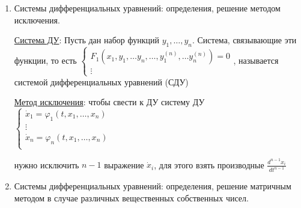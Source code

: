 \documentclass[12pt]{article}
\begin{document}
\begin{enumerate}
\begin{enumerate}
            \item Поиск частного решения в виде $y^*(x) = C_1(x)y_1(x) + C_2(x)y_2(x)$, где функции $C_1(x), C_2(x)$ заменяют константы из общего решения однородного уравнения

            \item Решение системы для производных $C_1^\prime(x), C_2^\prime(x)$:
            
            $\begin{cases} 
            C_1^\prime y_1 + C_2^\prime y_2 = 0 \\
            C_1^\prime y_1^\prime + C_2^\prime y_2^\prime = f(x)
            \end{cases}$
            
            с использованием вронскиана $W = y_1y_2^\prime - y_2y_1^\prime$
            \item Интегрирование выражений: 
            
            $C_1(x) = \int -\frac{y_2 f}{W}dx, \quad C_2(x) = \int \frac{y_1 f}{W}dx$
        \end{enumerate}


        \item Системы дифференциальных уравнений: определения, решение методом исключения.

        \hyperlink{desystem}{Система ДУ}: \Defs Пусть дан набор функций $y_1, \dots, y_n$. Система, связывающие эти функции, то есть
        $\begin{cases}
             F_1(x_1, y_1, \dots y_n, \dots, y_1^{(n)}, \dots y_n^{(n)}) = 0 \\
             \vdots
        \end{cases}$, называется системой дифференциальных уравнений (СДУ)

        \hyperlink{exceptionmethod}{Метод исключения}: чтобы свести к ДУ систему ДУ $\begin{cases}
            \dot x_1 = \varphi_1(t, x_1, \dots, x_n) \\
            \vdots \\
            \dot x_n = \varphi_n(t, x_1, \dots, x_n) \\
       \end{cases}$ 
       
       нужно исключить $n - 1$ выражение $\dot x_i$, для этого взять производные $\frac{d^{n - 1} x_i}{dt^{n - 1}}$

        \item Системы дифференциальных уравнений: определения, решение матричным методом в случае различных вещественных собственных чисел.


\end{enumerate}
\end{document}
